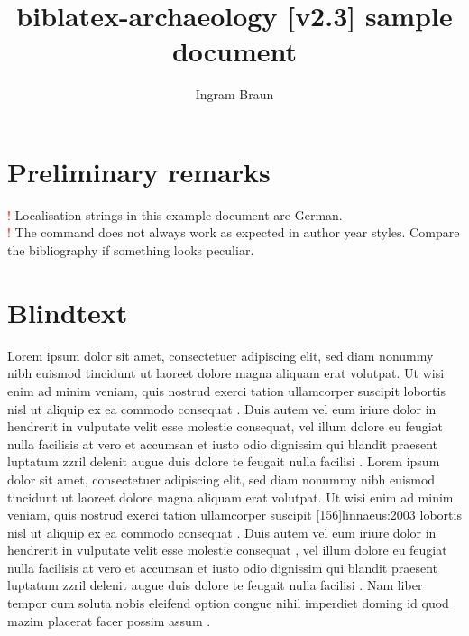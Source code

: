 \documentclass[a4paper,12pt]{scrartcl}
\title{biblatex-archaeology [v2.3] sample document}
\subtitle{\explhead}
\author{Ingram Braun}
\newcommand{\exmplwarn}[1]{\textcolor{red}{\Huge!} #1\\}
\begin{document}
\maketitle
\tableofcontents

\section{Preliminary remarks}

\exmplwarn{Localisation strings in this example document are German.}
    {\exmplwarn{The \detokenize{\fullcite} command does not always work as expected in author year styles. Compare the bibliography if something looks peculiar.}%
    }
    {}

\section{Blindtext}

Lorem ipsum dolor sit amet, consectetuer adipiscing elit, sed diam nonummy nibh euismod tincidunt ut laoreet dolore magna aliquam erat volutpat. Ut wisi enim ad minim veniam, quis nostrud exerci tation ullamcorper suscipit lobortis nisl ut aliquip ex ea commodo consequat \autocite{auler:hiller:2015}. Duis autem vel eum iriure dolor in hendrerit in vulputate velit esse molestie consequat, vel illum dolore eu feugiat nulla facilisis at vero et accumsan et iusto odio dignissim qui blandit praesent luptatum zzril delenit augue duis dolore te feugait nulla facilisi \autocites[68]{auler:hiller:2011}[48]{auler:hiller:2015a}[159--187]{auler:hiller:2015}[40--41]{auler:hiller:2016}[15--23]{tacitus:1981}[19]{de:neck:yoder:1978}[69]{auler:hiller:2011}. Lorem ipsum dolor sit amet, consectetuer adipiscing elit, sed diam nonummy nibh euismod tincidunt ut laoreet dolore magna aliquam erat volutpat. Ut wisi enim ad minim veniam, quis nostrud exerci tation ullamcorper suscipit [156]{linnaeus:2003} lobortis nisl ut aliquip ex ea commodo consequat \autocite{kenmore}. Duis autem vel eum iriure dolor in hendrerit in vulputate velit esse molestie consequat \autocites[73--75]{mueller:f:1991}[105--108]{mueller:a:1991}[68--70]{mueller:h:1900}[61]{mueller:har:1988}, vel illum dolore eu feugiat nulla facilisis at vero et accumsan et iusto odio dignissim qui blandit praesent luptatum zzril delenit augue duis dolore te feugait nulla facilisi \autocite{kenmore}. Nam liber tempor cum soluta nobis eleifend option congue nihil imperdiet doming id quod mazim placerat facer possim assum \autocite[145--146]{todorova:et:al:1981}.
\end{document}
